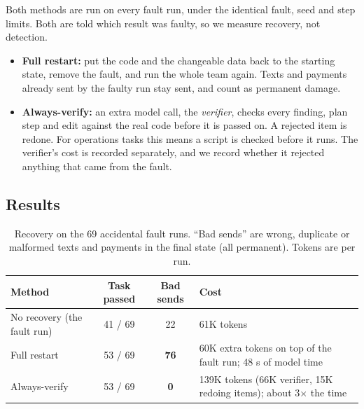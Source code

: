 \documentclass{article}
\begin{document}
Both methods are run on every fault run, under the identical fault, seed and step limits. Both are told which result was faulty, so we measure recovery, not detection.
\begin{itemize}
  \item \textbf{Full restart:} put the code and the changeable data back to the starting state, remove the fault, and run the whole team again. Texts and payments already sent by the faulty run stay sent, and count as permanent damage.
  \item \textbf{Always-verify:} an extra model call, the \emph{verifier}, checks every finding, plan step and edit against the real code before it is passed on. A rejected item is redone. For operations tasks this means a script is checked before it runs. The verifier's cost is recorded separately, and we record whether it rejected anything that came from the fault.
\end{itemize}

\subsection{Results}

\begin{table}[htbp]
\centering
\small
\caption{Recovery on the 69 accidental fault runs. ``Bad sends'' are wrong, duplicate or malformed texts and payments in the final state (all permanent). Tokens are per run.}
\label{tab:recovery}
\begin{tabularx}{\linewidth}{@{}lccL@{}}
\toprule
Method & Task passed & Bad sends & Cost \\
\midrule
No recovery (the fault run) & 41 / 69 & 22 & 61K tokens \\
Full restart & 53 / 69 & \textbf{76} & 60K extra tokens on top of the fault run; 48 s of model time \\
Always-verify & 53 / 69 & \textbf{0} & 139K tokens (66K verifier, 15K redoing items); about 3$\times$ the time \\
\bottomrule
\end{tabularx}
\end{table}
\end{document}
